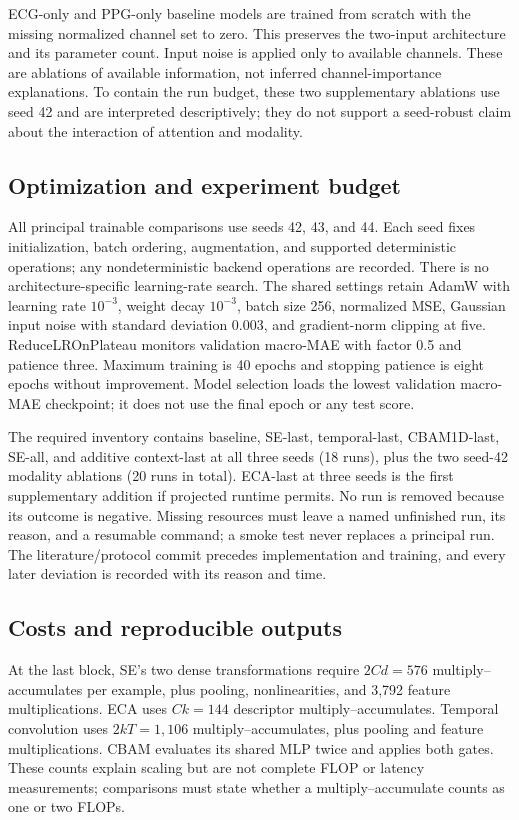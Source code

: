 \documentclass[11pt]{article}
\begin{document}
ECG-only and PPG-only baseline models are trained from scratch with the missing normalized channel set to zero. This preserves the two-input architecture and its parameter count. Input noise is applied only to available channels. These are ablations of available information, not inferred channel-importance explanations. To contain the run budget, these two supplementary ablations use seed 42 and are interpreted descriptively; they do not support a seed-robust claim about the interaction of attention and modality.

\subsection{Optimization and experiment budget}
All principal trainable comparisons use seeds 42, 43, and 44. Each seed fixes initialization, batch ordering, augmentation, and supported deterministic operations; any nondeterministic backend operations are recorded. There is no architecture-specific learning-rate search. The shared settings retain AdamW with learning rate $10^{-3}$, weight decay $10^{-3}$, batch size 256, normalized MSE, Gaussian input noise with standard deviation 0.003, and gradient-norm clipping at five. ReduceLROnPlateau monitors validation macro-MAE with factor 0.5 and patience three. Maximum training is 40 epochs and stopping patience is eight epochs without improvement. Model selection loads the lowest validation macro-MAE checkpoint; it does not use the final epoch or any test score.

The required inventory contains baseline, SE-last, temporal-last, CBAM1D-last, SE-all, and additive context-last at all three seeds (18 runs), plus the two seed-42 modality ablations (20 runs in total). ECA-last at three seeds is the first supplementary addition if projected runtime permits. No run is removed because its outcome is negative. Missing resources must leave a named unfinished run, its reason, and a resumable command; a smoke test never replaces a principal run. The literature/protocol commit precedes implementation and training, and every later deviation is recorded with its reason and time.

\subsection{Costs and reproducible outputs}
At the last block, SE's two dense transformations require $2Cd=576$ multiply--accumulates per example, plus pooling, nonlinearities, and 3,792 feature multiplications. ECA uses $Ck=144$ descriptor multiply--accumulates. Temporal convolution uses $2kT=1,106$ multiply--accumulates, plus pooling and feature multiplications. CBAM evaluates its shared MLP twice and applies both gates. These counts explain scaling but are not complete FLOP or latency measurements; comparisons must state whether a multiply--accumulate counts as one or two FLOPs.
\end{document}

